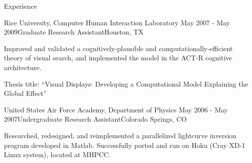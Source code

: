 \begin{rSection}{Experience}
  \begin{rSubsection}{Rice University, Computer Human Interaction Laboratory}
    {May 2007 - May 2009}{Graduate Research Assistant}{Houston, TX}
  \item Improved and validated a cognitively-plausible and computationally-efficient theory of visual search, 
    and implemented the model in the ACT-R cognitive architecture.
  \item  Thesis title: ``Visual Displays: Developing a Computational Model Explaining the Global Effect''
  \end{rSubsection}

  \begin{rSubsection}{United States Air Force Academy, Department of Physics}
    {May 2006 - May 2007}{Undergraduate Research Assistant}{Colorado Springs, CO}
  \item Researched, redesigned, and reimplemented a parallelized lightcurve inversion program developed in Matlab.
    Successfully ported and run on Hoku (Cray XD-1 Linux system), located at MHPCC.
  \end{rSubsection}


\end{rSection}
